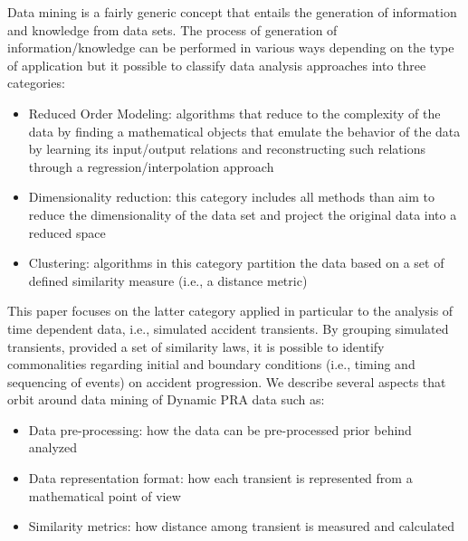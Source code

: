 Data mining is a fairly generic concept that 
entails the generation of information and knowledge from data sets. The process of generation 
of information/knowledge can be performed in various ways depending on the type of application 
but it possible to classify data analysis approaches into three categories: 
\begin{itemize}
  \item Reduced Order Modeling: algorithms that reduce to the complexity of the data by finding a 
        mathematical objects that emulate the behavior of the data by learning its input/output 
        relations and reconstructing such relations through a regression/interpolation approach
  \item Dimensionality reduction: this category includes all methods than aim to reduce the 
        dimensionality of the data set and project the original data into a reduced space
  \item Clustering: algorithms in this category partition the data based on a set of defined 
        similarity measure (i.e., a distance metric)
\end{itemize}

This paper focuses on the latter category applied in particular to the analysis of time dependent 
data, i.e., simulated accident transients. By grouping simulated transients, provided a set of 
similarity laws, it is possible to identify commonalities regarding initial and boundary conditions 
(i.e., timing and sequencing of events)
on accident progression.
We describe several aspects that orbit around data mining of Dynamic PRA data such as:
\begin{itemize}
\item Data pre-processing: how the data can be pre-processed prior behind analyzed
\item Data representation format: how each transient is represented from a mathematical point of view
\item Similarity metrics: how distance among transient is measured and calculated
\end{itemize} 